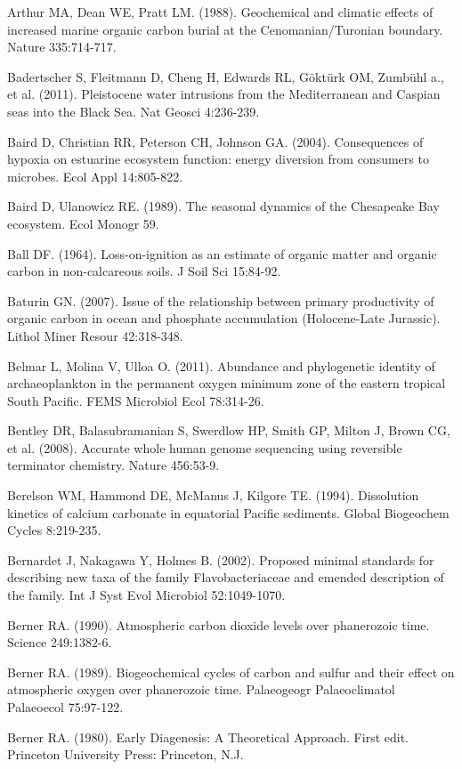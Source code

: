 Arthur MA, Dean WE, Pratt LM. (1988). Geochemical and climatic effects of increased marine organic carbon burial at the Cenomanian/Turonian boundary. Nature 335:714-717.

Badertscher S, Fleitmann D, Cheng H, Edwards RL, G\"okt\"urk OM, Zumb\"uhl a., et al. (2011). Pleistocene water intrusions from the Mediterranean and Caspian seas into the Black Sea. Nat Geosci 4:236-239.

Baird D, Christian RR, Peterson CH, Johnson GA. (2004). Consequences of hypoxia on estuarine ecosystem function: energy diversion from consumers to microbes. Ecol Appl 14:805-822.

Baird D, Ulanowicz RE. (1989). The seasonal dynamics of the Chesapeake Bay ecosystem. Ecol Monogr 59.

Ball DF. (1964). Loss-on-ignition as an estimate of organic matter and organic carbon in non-calcareous soils. J Soil Sci 15:84-92.

Baturin GN. (2007). Issue of the relationship between primary productivity of organic carbon in ocean and phosphate accumulation (Holocene-Late Jurassic). Lithol Miner Resour 42:318-348.

Belmar L, Molina V, Ulloa O. (2011). Abundance and phylogenetic identity of archaeoplankton in the permanent oxygen minimum zone of the eastern tropical South Pacific. FEMS Microbiol Ecol 78:314-26.

Bentley DR, Balasubramanian S, Swerdlow HP, Smith GP, Milton J, Brown CG, et al. (2008). Accurate whole human genome sequencing using reversible terminator chemistry. Nature 456:53-9.

Berelson WM, Hammond DE, McManus J, Kilgore TE. (1994). Dissolution kinetics of calcium carbonate in equatorial Pacific sediments. Global Biogeochem Cycles 8:219-235.

Bernardet J, Nakagawa Y, Holmes B. (2002). Proposed minimal standards for describing new taxa of the family Flavobacteriaceae and emended description of the family. Int J Syst Evol Microbiol 52:1049-1070.

Berner RA. (1990). Atmospheric carbon dioxide levels over phanerozoic time. Science 249:1382-6.

Berner RA. (1989). Biogeochemical cycles of carbon and sulfur and their effect on atmospheric oxygen over phanerozoic time. Palaeogeogr Palaeoclimatol Palaeoecol 75:97-122.

Berner RA. (1980). Early Diagenesis: A Theoretical Approach. First edit. Princeton University Press: Princeton, N.J.

